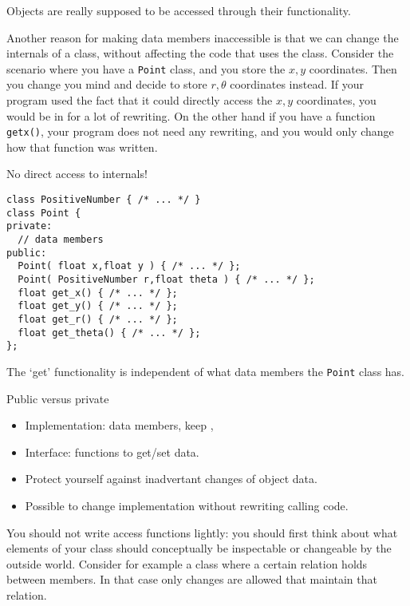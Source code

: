 Objects are really supposed to be accessed through their
functionality.

Another reason for making data members inaccessible is that we can
change the internals of a class, without affecting the code that uses
the class. Consider the scenario where you have a \lstinline{Point} class, and
you store the $x,y$ coordinates. Then you change you mind and decide
to store $r,\theta$ coordinates instead. If your program used the fact
that it could directly access the $x,y$ coordinates, you would be in
for a lot of rewriting. On the other hand if you have a function
\lstinline{getx()}, your program does not need any rewriting, and you would
only change how that function was written.

\begin{block}{No direct access to internals!}
  \label{sl:repr-independent}
\begin{lstlisting}
class PositiveNumber { /* ... */ }
class Point {
private:
  // data members
public:
  Point( float x,float y ) { /* ... */ };
  Point( PositiveNumber r,float theta ) { /* ... */ };
  float get_x() { /* ... */ };
  float get_y() { /* ... */ };
  float get_r() { /* ... */ };
  float get_theta() { /* ... */ };
};
\end{lstlisting}
  The `get' functionality is independent of what data members the
  \lstinline{Point} class has.
\end{block}

\begin{block}{Public versus private}
  \label{sl:interfaceimpl}
  \begin{itemize}
  \item Implementation: data members, keep ,
  \item Interface:  functions to get/set data.
  \item Protect yourself against inadvertant changes of object data.
  \item Possible to change implementation without rewriting calling code.
  \end{itemize}
\end{block}

You should not write access functions lightly: you should first think
about what elements of your class should conceptually be inspectable
or changeable by the outside world.  Consider for example a class
where a certain relation holds between members. In that case only
changes are allowed that maintain that relation.

